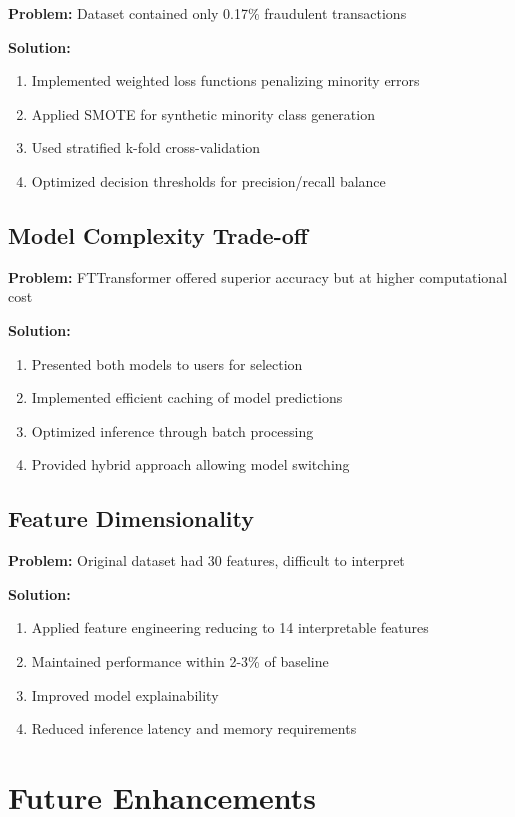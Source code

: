 \documentclass[12pt,a4paper,twoside]{report}
\begin{document}
\textbf{Problem:} Dataset contained only 0.17\% fraudulent transactions

\textbf{Solution:} 
\begin{enumerate}
    \item Implemented weighted loss functions penalizing minority errors
    \item Applied SMOTE for synthetic minority class generation
    \item Used stratified k-fold cross-validation
    \item Optimized decision thresholds for precision/recall balance
\end{enumerate}

\subsection*{Model Complexity Trade-off}

\textbf{Problem:} FTTransformer offered superior accuracy but at higher computational cost

\textbf{Solution:}
\begin{enumerate}
    \item Presented both models to users for selection
    \item Implemented efficient caching of model predictions
    \item Optimized inference through batch processing
    \item Provided hybrid approach allowing model switching
\end{enumerate}

\subsection*{Feature Dimensionality}

\textbf{Problem:} Original dataset had 30 features, difficult to interpret

\textbf{Solution:}
\begin{enumerate}
    \item Applied feature engineering reducing to 14 interpretable features
    \item Maintained performance within 2-3\% of baseline
    \item Improved model explainability
    \item Reduced inference latency and memory requirements
\end{enumerate}

\section*{Future Enhancements}
\end{document}
